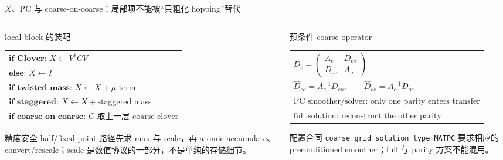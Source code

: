 \documentclass[UTF8,aspectratio=169,11pt]{ctexbeamer}
\begin{document}
\begin{frame}[t]{$X$、PC 与 coarse-on-coarse：局部项不能被“只粗化 hopping”替代}
  \small
  \begin{columns}[T,totalwidth=\textwidth]
    \begin{column}{0.48\textwidth}
      \begin{block}{local block 的装配}
        \footnotesize
        \begin{tabular}{@{}l@{}}
          $\textbf{if Clover: }X\leftarrow V^\dagger C V$ \\
          $\textbf{else: }X\leftarrow I$ \\
          $\textbf{if twisted mass: }X\leftarrow X+\mu\text{ term}$ \\
          $\textbf{if staggered: }X\leftarrow X+\text{staggered mass}$ \\
          $\textbf{if coarse-on-coarse: }C\text{ 取上一层 coarse clover}$
        \end{tabular}
      \end{block}
      \begin{block}{精度安全}
        half/fixed-point 路径先求 max 与 scale，再 atomic accumulate、convert/rescale；scale 是数值协议的一部分，不是单纯的存储细节。
      \end{block}
    \end{column}
    \begin{column}{0.48\textwidth}
      \begin{block}{预条件 coarse operator}
        \footnotesize
        \begin{tabular}{@{}l@{}}
          $D_c=\begin{pmatrix}A_e& D_{eo}\\D_{oe}&A_o\end{pmatrix}$ \\
          $\widehat D_{eo}=A_e^{-1}D_{eo},\qquad
            \widehat D_{oe}=A_o^{-1}D_{oe}$ \\
          $\text{PC smoother/solver: only one parity enters transfer}$ \\
          $\text{full solution: reconstruct the other parity}$
        \end{tabular}
      \end{block}
      \begin{alertblock}{配置合同}
        \texttt{coarse\_grid\_solution\_type=MATPC} 要求相应的 preconditioned smoother；full 与 parity 方案不能混用。
      \end{alertblock}
    \end{column}

\end{columns}
\end{frame}
\end{document}
